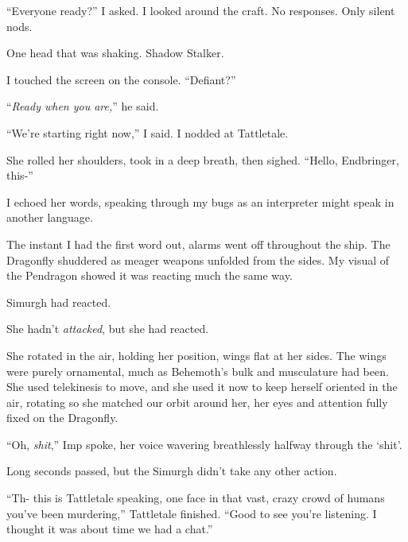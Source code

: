 ``Everyone ready?'' I asked.  I looked around the craft.  No responses.  Only silent nods.



One head that was shaking.  Shadow Stalker.



I touched the screen on the console.  ``Defiant?''



``\emph{Ready when you are,}'' he said.



``We're starting right now,'' I said.  I nodded at Tattletale.



She rolled her shoulders, took in a deep breath, then sighed.  ``Hello, Endbringer, this-''



I echoed her words, speaking through my bugs as an interpreter might speak in another language.



The instant I had the first word out, alarms went off throughout the ship.  The Dragonfly shuddered as meager weapons unfolded from the sides.  My visual of the Pendragon showed it was reacting much the same way.



Simurgh had reacted.



She hadn't \emph{attacked}, but she had reacted.



She rotated in the air, holding her position, wings flat at her sides.  The wings were purely ornamental, much as Behemoth's bulk and musculature had been.  She used telekinesis to move, and she used it now to keep herself oriented in the air, rotating so she matched our orbit around her, her eyes and attention fully fixed on the Dragonfly.



``Oh, \emph{shit},'' Imp spoke, her voice wavering breathlessly halfway through the `shit'.



Long seconds passed, but the Simurgh didn't take any other action.



``Th- this is Tattletale speaking, one face in that vast, crazy crowd of humans you've been murdering,'' Tattletale finished.  ``Good to see you're listening.  I thought it was about time we had a chat.''



